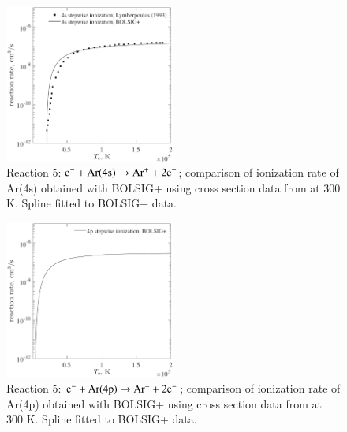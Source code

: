 \documentclass{warpdoc}
\begin{document}
\begin{figure}[ht]
     \centering
     \includegraphics[width=0.5\textwidth]{figs/reaction5.pdf}
     \caption{Reaction 5: $\rm e^- + Ar(4s) \rightarrow Ar^+ + 2e^-$; comparison of ionization rate of Ar(4s) obtained with BOLSIG+ using cross section data from \cite{pr:hyman:1979} at 300 K. Spline fitted to BOLSIG+ data.}
     \label{fig:rate_R5}
\end{figure}

\begin{figure}[ht]
     \centering
     \includegraphics[width=0.5\textwidth]{figs/reaction6.pdf}
     \caption{Reaction 5: $\rm e^- + Ar(4p) \rightarrow Ar^+ + 2e^-$; comparison of ionization rate of Ar(4p) obtained with BOLSIG+ using cross section data from \cite{pr:hyman:1979} at 300 K. Spline fitted to BOLSIG+ data.}
     \label{fig:rate_R6}
\end{figure}


\end{document}
